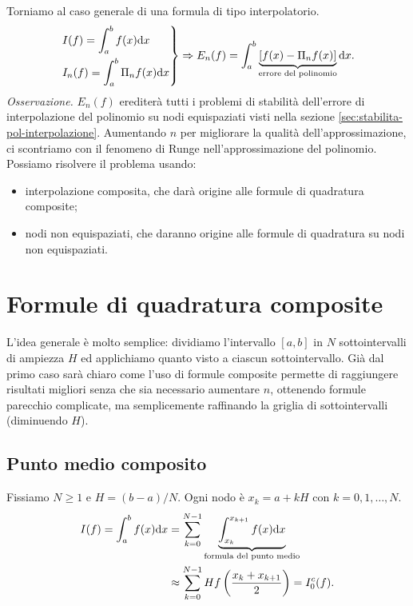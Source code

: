 Torniamo al caso generale di una formula di tipo interpolatorio.
\begin{equation*}
\begin{drcases}
I(f) =\int\nolimits ^{b}_{a} f(x) \dx\\
I_{n}(f) =\int\nolimits ^{b}_{a} \Pi _{n} f(x) \dx
\end{drcases} \Rightarrow E_{n}(f) =\int\nolimits ^{b}_{a}\underbrace{[ f(x) -\Pi _{n} f(x)]}_{\text{errore del polinomio}} \dx.
\end{equation*}
\textit{Osservazione.} $E_{n}(f)$ erediterà tutti i problemi di stabilità dell'errore di interpolazione del polinomio su nodi equispaziati visti nella sezione \ref{sec:stabilita-pol-interpolazione}.
Aumentando $n$ per migliorare la qualità dell'approssimazione, ci scontriamo con il fenomeno di Runge nell'approssimazione del polinomio. Possiamo risolvere il problema usando:
\begin{itemize}
\item interpolazione composita, che darà origine alle formule di quadratura composite;
\item nodi non equispaziati, che daranno origine alle formule di quadratura su nodi non equispaziati.
\end{itemize}
\section{Formule di quadratura composite}

L'idea generale è molto semplice: dividiamo l'intervallo $[a,b]$ in $N$ sottointervalli di ampiezza $H$ ed applichiamo quanto visto a ciascun sottointervallo. Già dal primo caso sarà chiaro come l'uso di formule composite permette di raggiungere risultati migliori senza che sia necessario aumentare $n$, ottenendo formule parecchio complicate, ma semplicemente raffinando la griglia di sottointervalli (diminuendo $H$).

\subsection{Punto medio composito}
Fissiamo $N\geqslant 1$ e $H=(b-a)/N$. Ogni nodo è $x_{k} =a+kH$ con $k=0,1,\dotsc ,N$.
\begin{align*}
	I(f) =\int\nolimits ^{b}_{a} f(x) \mathrm d x & =\sum\limits ^{N-1}_{k=0}\underbrace{\int\nolimits ^{x_{k+1}}_{x_{k}} f(x) \mathrm d x}_{\text{formula del punto medio}} \\
	& \approx \sum\limits ^{N-1}_{k=0} Hf\left(\frac{x_{k} +x_{k+1}}{2}\right) =I^{c}_{0}(f).
\end{align*}

